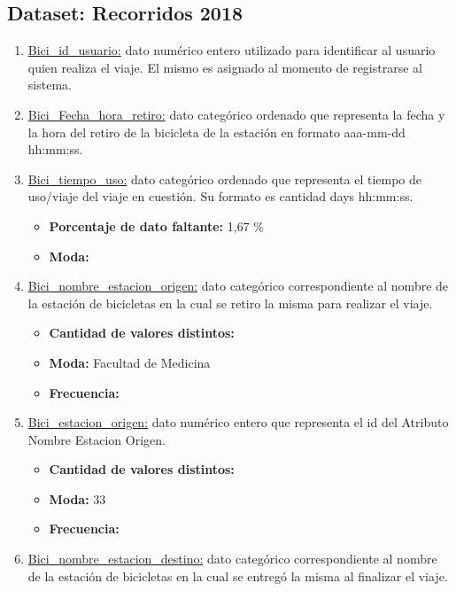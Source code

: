 \subsection{Dataset: Recorridos 2018}
\begin{enumerate}
    \item \underline{Bici_id_usuario:} dato numérico entero utilizado para identificar al usuario quien realiza el viaje. El mismo es asignado al momento de registrarse al sistema. 
    \item \underline{Bici_Fecha_hora_retiro:} dato categórico ordenado que representa la fecha y la hora del retiro de la bicicleta de la estación en formato aaa-mm-dd hh:mm:ss.
    \item \underline{Bici_tiempo_uso:} dato categórico ordenado que representa el tiempo de uso/viaje del viaje en cuestión. Su formato es cantidad days hh:mm:ss.
        \begin{itemize}
            \item \textbf{Porcentaje de dato faltante:} 1,67 \%
            \item \textbf{Moda:} 
        \end{itemize}    
    \item \underline{Bici_nombre_estacion_origen:} dato categórico correspondiente al nombre de la estación de bicicletas en la cual se retiro la misma para realizar el viaje.
        \begin{itemize}
            \item \textbf{Cantidad de valores distintos:} 
            \item \textbf{Moda:} Facultad de Medicina
            \item \textbf{Frecuencia:}
        \end{itemize}    
    \item \underline{Bici_estacion_origen:} dato numérico entero que representa el id del Atributo Nombre Estacion Origen.
        \begin{itemize}
            \item \textbf{Cantidad de valores distintos:} 
            \item \textbf{Moda:} 33
            \item \textbf{Frecuencia:}
        \end{itemize}    
    \item \underline{Bici_nombre_estacion_destino:} dato categórico correspondiente al nombre de la estación de bicicletas en la cual se entregó la misma al finalizar el viaje.
        \begin{itemize}

\end{itemize}
\end{enumerate}
